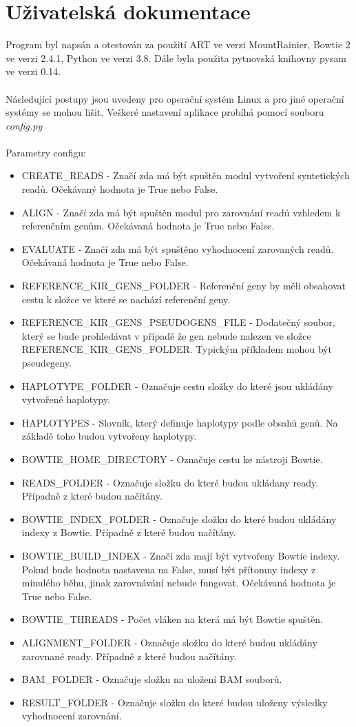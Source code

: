 \documentclass[czech,DP]{thesiskiv}
\numberwithin{equation}{section}
\begin{document}
\chapter{Uživatelská dokumentace}
Program byl napsán a otestován za použití ART ve verzi MountRainier, Bowtie 2 ve verzi 2.4.1, Python ve verzi 3.8. Dále byla použita pytnovská knihovny pysam ve verzi 0.14. 
\\
\\
Následující postupy jsou uvedeny pro operační systém Linux a pro jiné operační systémy se mohou lišit. Veškeré nastavení aplikace probíhá pomocí souboru \textit{config.py}
\\
\\
\noindent
Parametry configu:
\begin{itemize}
	\item CREATE\_READS - Značí zda má být spuštěn modul vytvoření syntetických readů. Očekávaný hodnota je True nebo False.
	\item ALIGN - Značí zda má být spuštěn modul pro zarovnání readů vzhledem k referenčním genům. Očekávaná hodnota je True nebo False.
	\item EVALUATE - Značí zda má být spuštěno vyhodnocení zarovaných readů. Očekávaná hodnota je True nebo False.
	\item REFERENCE\_KIR\_GENS\_FOLDER - Referenční geny by měli obsahovat cestu k složce ve které se nachází referenční geny.
	\item REFERENCE\_KIR\_GENS\_PSEUDOGENS\_FILE - Dodatečný soubor, který se bude prohledávat v případě že gen nebude nalezen ve složce REFERENCE\_KIR\_GENS\_FOLDER. Typickým příkladem mohou být pseudegeny. 
	\item HAPLOTYPE\_FOLDER - Označuje cestu složky do které jsou ukládány vytvořené haplotypy. 
	\item HAPLOTYPES - Slovník, který definuje haplotypy podle obsahů genů. Na základě toho budou vytvořeny haplotypy.
	\item BOWTIE\_HOME\_DIRECTORY - Označuje cestu ke nástroji Bowtie.
	\item READS\_FOLDER - Označuje složku do které budou ukládany ready. Případně z které budou načítány.
	\item BOWTIE\_INDEX\_FOLDER - Označuje složku do které budou ukládány indexy z Bowtie. Případně z které budou načítány. 
	\item BOWTIE\_BUILD\_INDEX - Značí zda mají být vytvořeny Bowtie indexy. Pokud bude hodnota nastavena na False, musí být přítomny indexy z minulého běhu, jinak zarovnávání nebude fungovat. Očekávaná hodnota je True nebo False.
	\item BOWTIE\_THREADS - Počet vláken na která má být Bowtie spuštěn.	
	\item ALIGNMENT\_FOLDER - Označuje složku do které budou ukládány zarovnané ready. Případně z které budou načítány. 
	\item BAM\_FOLDER - Označuje složku na uložení BAM souborů.  
	\item RESULT\_FOLDER - Označuje složku do které budou uloženy výsledky vyhodnocení zarovnání.
\end{itemize}
\end{document}
